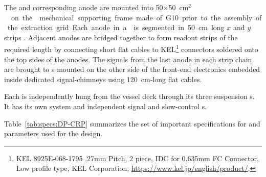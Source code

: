 The  and corresponding anode are mounted into 
\num{50}$\times$\SI{50}{cm$^2$}  
 on the  mechanical supporting frame made of G10 prior to the assembly of the extraction grid. Each anode in a  is segmented in \SI{50}{cm} long $x$ and $y$ strips . Adjacent  anodes are bridged together to form readout strips of the required length by connecting short flat cables to KEL\footnote{KEL 8925E-068-1795 .27mm Pitch, 2 piece, IDC for 0.635mm FC Connector, Low profile type, KEL Corporation\texttrademark{}, \url{https://www.kel.jp/english/product/}.} connectors soldered onto the top sides of the anodes. The signals from the last anode in each  strip chain are brought to \fdth{}s mounted on the other side of the front-end electronics embedded inside dedicated signal-\fdth chimneys using \SI{120}{cm}-long flat cables.

Each  is independently hung from the vessel deck through its three suspension \fdth{}s. It has its own  system and  independent signal and slow-control \fdth{}s.

Table~\ref{tab:specs:DP-CRP} summarizes the set of important specifications for \dpmod and parameters used for the  design. 



